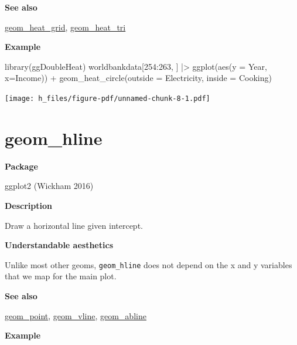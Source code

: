 \documentclass[
  letterpaper,
  DIV=11,
  numbers=noendperiod]{scrreprt}
\newenvironment{Shaded}{\begin{snugshade}}{\end{snugshade}}
\newcommand{\AttributeTok}[1]{\textcolor[rgb]{0.40,0.45,0.13}{#1}}
\newcommand{\DecValTok}[1]{\textcolor[rgb]{0.68,0.00,0.00}{#1}}
\newcommand{\FunctionTok}[1]{\textcolor[rgb]{0.28,0.35,0.67}{#1}}
\newcommand{\NormalTok}[1]{\textcolor[rgb]{0.00,0.23,0.31}{#1}}
\newcommand{\SpecialCharTok}[1]{\textcolor[rgb]{0.37,0.37,0.37}{#1}}
\begin{document}
\textbf{See also}

\hyperref[heat_grid]{geom\_heat\_grid},
\hyperref[heat_tri]{geom\_heat\_tri}

\textbf{Example}

\begin{Shaded}
\begin{Highlighting}[]
\FunctionTok{library}\NormalTok{(ggDoubleHeat)}
\NormalTok{worldbankdata[}\DecValTok{254}\SpecialCharTok{:}\DecValTok{263}\NormalTok{, ] }\SpecialCharTok{|\textgreater{}}
  \FunctionTok{ggplot}\NormalTok{(}\FunctionTok{aes}\NormalTok{(}\AttributeTok{y =}\NormalTok{ Year, }\AttributeTok{x=}\NormalTok{Income)) }\SpecialCharTok{+} 
  \FunctionTok{geom\_heat\_circle}\NormalTok{(}\AttributeTok{outside =}\NormalTok{ Electricity,}
           \AttributeTok{inside =}\NormalTok{ Cooking) }
\end{Highlighting}
\end{Shaded}

\texttt{[image: h\_files/figure-pdf/unnamed-chunk-8-1.pdf]}

\section{geom\_hline}\label{hline}

\textbf{Package}

ggplot2 (Wickham 2016)

\textbf{Description}

Draw a horizontal line given intercept.

\textbf{Understandable aesthetics}

Unlike most other geoms, \texttt{geom\_hline} does not depend on the x
and y variables that we map for the main plot.

\textbf{See also}

\hyperref[point]{geom\_point}, \hyperref[vline]{geom\_vline},
\hyperref[hline]{geom\_abline}

\textbf{Example}
\end{document}
